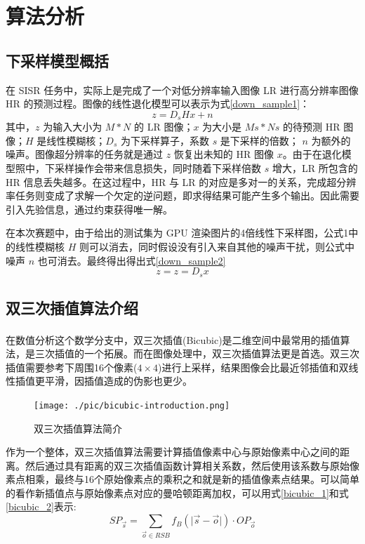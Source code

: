 \documentclass[12pt, a4paper, oneside]{ctexbook}
\begin{document}
	
	\chapter{算法分析}
	\section{下采样模型概括}
	在 SISR 任务中，实际上是完成了一个对低分辨率输入图像 LR 进行高分辨率图像 HR 的预测过程。图像的线性退化模型可以表示为式\ref{down_sample1}：
	\begin{equation}
		z=D_sHx + n \label{down_sample1}
	\end{equation}
	其中，$z$ 为输入大小为 $M*N$ 的 LR 图像；$x$ 为大小是 $Ms*Ns$ 的待预测 HR 图像；$H$ 是线性模糊核；$D_s$ 为下采样算子，系数 $s$ 是下采样的倍数； $n$ 为额外的噪声。图像超分辨率的任务就是通过 $z$ 恢复出未知的 HR 图像 $x$。由于在退化模型照中，下采样操作会带来信息损失，同时随着下采样倍数 $s$ 增大，LR 所包含的 HR 信息丢失越多。在这过程中，HR 与 LR 的对应是多对一的关系，完成超分辨率任务则变成了求解一个欠定的逆问题，即求得结果可能产生多个输出。因此需要引入先验信息，通过约束获得唯一解。\par 在本次赛题中，由于给出的测试集为 GPU 渲染图片的4倍线性下采样图，公式1中的线性模糊核 $H$ 则可以消去，同时假设没有引入来自其他的噪声干扰，则公式中噪声 $n$ 也可消去。最终得出得出式\ref{down_sample2}
	\begin{equation}
		z=z=D_sx \label{down_sample2}
	\end{equation}
	
	\section{双三次插值算法介绍}
	在数值分析这个数学分支中，双三次插值(Bicubic)\textsuperscript{\cite{10}\cite{11}}是二维空间中最常用的插值算法，是三次插值的一个拓展。而在图像处理中，双三次插值算法更是首选。双三次插值需要参考下周围16个像素($4 \times 4$)进行上采样，结果图像会比最近邻插值和双线性插值更平滑，因插值造成的伪影也更少。
		\begin{figure}[h]
			\centering
			\texttt{[image: ./pic/bicubic-introduction.png]}
			\caption{双三次插值算法简介}
			\label{bicubic_introduction}
		\end{figure}
	\par
	作为一个整体，双三次插值算法需要计算插值像素中心与原始像素中心之间的距离。然后通过具有距离的双三次插值函数计算相关系数，然后使用该系数与原始像素点相乘，最终与16个原始像素点的乘积之和就是新的插值像素点结果。可以简单的看作新插值点与原始像素点对应的曼哈顿距离加权，可以用式\ref{bicubic_1}和式\ref{bicubic_2}表示:
	\begin{equation}
	SP_{\vec{s}}=\sum_{\vec{o}\in{RSB}}f_B(\vert\vec{s}-\vec{o}\vert)\cdot OP_{\vec{o}}		
	\label{bicubic_1}
	\end{equation}	
\end{document}
